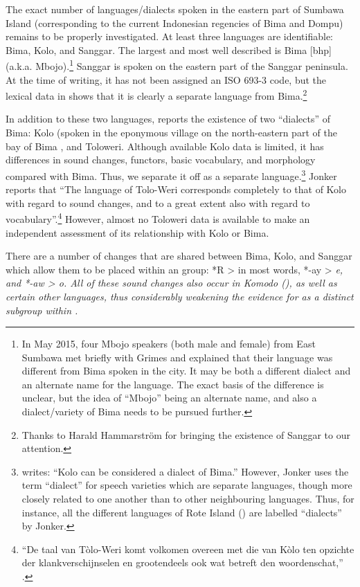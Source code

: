 The exact number of languages/dialects spoken in the eastern
part of Sumbawa Island (corresponding to the current Indonesian
regencies of Bima and Dompu) remains to be properly investigated.
At least three languages are identifiable: Bima, Kolo, and Sanggar.
The largest and most well described is Bima [bhp] (a.k.a.
Mbojo).\footnote{
		In May 2015, four Mbojo speakers (both male
		and female) from East Sumbawa met briefly with Grimes
		and explained that their language was different from Bima spoken in the city.
		It may be both a different dialect
		and an alternate name for the language.
		The exact basis of the difference is unclear,
		but the idea of “Mbojo” being an alternate name,
		and also a dialect/variety of Bima needs to be pursued further.}
Sanggar is spoken on the eastern part of the Sanggar peninsula.
At the time of writing,
it has not been assigned an ISO 693-3 code,
but the lexical data in \citet{Zollinger1850} shows that it is
clearly a separate language from Bima.\footnote{
		Thanks to Harald Hammarström for bringing the existence of Sanggar
		to our attention.} 

In addition to these two languages,
\citet[3--4]{Jonker1896} reports the existence of two “dialects” of
Bima: Kolo (spoken in the eponymous village on the north-eastern
part of the bay of Bima \citep{PartamiKaryawan1995}, and Toloweri.
Although available Kolo data is limited,
it has differences in sound changes,
functors, basic vocabulary, and morphology compared with Bima.
Thus, we separate it off as a separate language.\footnote{
		\citet[4]{Jonker1896}
		writes: “Kolo can be considered a dialect of Bima.” However,
		Jonker uses the term “dialect” for speech varieties which are
		separate languages, though more closely related to one another
		than to other neighbouring languages.
		Thus, for instance, all the different languages of Rote Island
		() are labelled “dialects” by Jonker.}
Jonker reports
that “The language of Tolo-Weri corresponds completely to that
of Kolo with regard to sound changes,
and to a great extent also with regard to vocabulary”.\footnote{
“De
taal van Tòlo-Weri komt volkomen overeen met die van Kòlo ten
opzichte der klankverschijnselen en grootendeels ook wat betreft
den woordenschat,” \citep[4]{Jonker1896}.}
However,
almost no Toloweri data is available to make an independent
assessment of its relationship with Kolo or Bima.

There are a number of changes that are shared between Bima,
Kolo, and Sanggar which allow them to be placed within an  group: *R > {\0} in most words, *-ay > \it{e,}
and *-aw > \it{o}.
All of these sound changes also occur in Komodo (),
as well as certain other  languages,
thus considerably weakening the evidence for 
as a distinct subgroup within .

